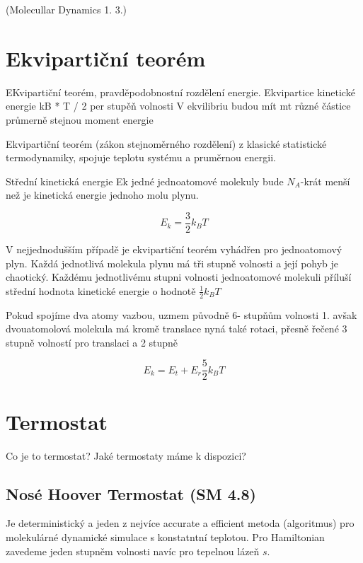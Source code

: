 (Molecullar Dynamics 1. 3.)

\section{Ekvipartiční teorém}

EKvipartiční teorém, pravděpodobnostní rozdělení energie.
Ekvipartice kinetické energie kB * T / 2 per stupěň volnosti
V ekvilibriu budou mít mt různé částice průmerně stejnou moment energie

Ekvipartiční teorém (zákon stejnoměrného rozdělení) z klasické statistické termodynamiky, spojuje teplotu systému a 
pruměrnou energii. 

Střední kinetická energie Ek jedné jednoatomové molekuly bude $N_A$-krát menší než je kinetická energie 
jednoho molu plynu.

\begin{equation}
    E_k = \frac{3}{2} k_B T
\end{equation}
    
V nejjednodušším případě je ekvipartiční teorém vyhádřen pro jednoatomový plyn.
Každá jednotlivá  molekula plynu má tři stupně volnosti a její pohyb je chaotický.
Každému jednotlivému stupni volnosti jednoatomové molekuli příluší střední hodnota kinetické energie o hodnotě  $\frac{1}{2} k_B T$

Pokud spojíme dva  atomy vazbou, uzmem původně 6- stupňům volnosti 1. avšak dvouatomolová molekula má kromě translace nyná také  rotaci, přesně řečené 3 stupně volností pro translaci a 2 stupně 

\begin{equation}
    E_k = E_t + E_r \frac{5}{2} k_B T
\end{equation}

\section{Termostat}

Co je to termostat?
Jaké termostaty máme k dispozici?

\subsection{Nosé Hoover Termostat (SM 4.8)}

Je deterministický a jeden z nejvíce accurate a efficient metoda (algoritmus) pro molekulárné dynamické simulace s konstatntní teplotou. Pro Hamiltonian zavedeme jeden stupněm volnosti 
navíc pro tepelnou lázeň $s$.

